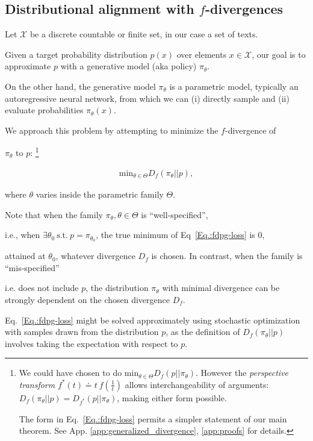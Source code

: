 \subsection{Distributional alignment with $f$-divergences}\label{sec:fdpg}

{Let $\mathcal{X}$ be} a discrete {countable or finite} set, {in our case a set of texts.}

Given a target probability distribution $p(x)$ over elements $x\in \mathcal{X}$, our goal is to approximate $p$ with a generative model (aka policy) $\pi_\theta$. 

On the other hand, the generative model $\pi_\theta$ is a parametric model, typically an autoregressive neural network, from which we can (i) directly sample and (ii) evaluate probabilities $\pi_\theta(x)$.  

We approach this problem by attempting to minimize the $f$-divergence of

$\pi_{\theta}$ to $p$:
\footnote{We could have chosen to do $\text{min}_{\theta\in\Theta}D_{f}(p||\pi_{\theta})$. However the \emph{perspective transform} $f^{*}(t)\doteq t\ f(\frac{1}{t})$ 
allows interchangeability of arguments: $D_f(\pi_\theta||p)=D_{f^{*}}(p||\pi_\theta)$, 
{making either form possible.}

The form in Eq.~\eqref{Eq.:fdpg-loss} permits a simpler statement of our main theorem. See App. \ref{app:generalized_divergence}, \ref{app:proofs} for details.}

\begin{align}
\text{min}_{\theta\in\Theta}D_{f}(\pi_{\theta}||p),

\label{Eq.:fdpg-loss}
\end{align}

where $\theta$ varies inside the parametric family $\Theta$. 

Note that when the family ${\pi_\theta}, \theta \in \Theta$ is ``well-specified'', 

i.e., when $\exists \theta_{0}\ \text{s.t.}\ p=\pi_{\theta_{0}}$, the true minimum of Eq~\eqref{Eq.:fdpg-loss} is $0$,

attained at $\theta_{0}$, whatever divergence $D_f$ is chosen. In contrast, when the family is ``mis-specified'' 

i.e. does not include $p$, the distribution ${\pi_\theta}$ with minimal divergence can be strongly dependent on the chosen divergence $D_f$.

Eq.~\eqref{Eq.:fdpg-loss} 
might be solved approximately using stochastic optimization with samples drawn from the distribution $p$, as the definition of $D_{f}(\pi_{\theta}||p)$ involves taking the expectation with respect to $p$.


